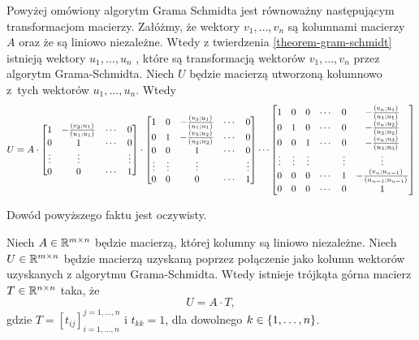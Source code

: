 \documentclass[12pt,a4paper]{report}
\newcommand{\mx}[1]{{#1}}
\newcommand{\proj}[2]{\frac{\scalar{#2}{#1}}{\scalar{#1}{#1}}}
\begin{document}
\begin{lemma} \label{lemma-matrix-formulation-of-gs}
Powyżej omówiony algorytm Grama Schmidta jest równoważny następującym transformacjom macierzy. Załóżmy, że wektory $v_{1}, \ldots, v_n$ są kolumnami macierzy $\mx{A}$ oraz że są liniowo niezależne. Wtedy z twierdzenia \ref{theorem-gram-schmidt} istnieją wektory $u_1, \ldots, u_n$ , które są transformacją wektorów $v_1, \ldots, v_n$ przez algorytm Grama-Schmidta. Niech $\mx{U}$ będzie macierzą utworzoną kolumnowo z~tych wektorów $u_1, \ldots, u_n$. Wtedy
{\small
$$
U = A \cdot 
\begin{bmatrix}
1 & -\proj{u_1}{v_2} & \cdots & 0 \\
0 & 1 & \cdots & 0 \\
\vdots & \vdots & & \vdots \\
0 & 0 & \cdots & 1
\end{bmatrix} \cdot
\begin{bmatrix}
1 & 0 & -\proj{u_1}{v_3} &\cdots & 0 \\
0 & 1 & -\proj{u_2}{v_3} &\cdots & 0 \\
0 & 0 & 1 & \cdots & 0 \\
\vdots & \vdots & \vdots &  & \vdots \\
0 & 0 & 0 & \cdots & 1
\end{bmatrix}
 \cdots
\begin{bmatrix}
1 & 0 & 0 & \cdots & 0 & -\proj{u_1}{v_n} \\
0 & 1 & 0 & \cdots & 0 &-\proj{u_2}{v_n} \\
0 & 0 & 1 & \cdots & 0 & -\proj{u_3}{v_n} \\
\vdots & \vdots & \vdots &  & \vdots & \vdots \\
0 & 0 & 0 & \cdots & 1 & -\proj{u_{n-1}}{v_n} \\
0 & 0 & 0 & \cdots & 0 & 1
\end{bmatrix}
$$ 
}
\end{lemma}

Dowód powyższego faktu jest oczywisty. 



\begin{lemma}\label{lemma-gram-schmidt-matrix}
Niech $\mx{A} \in \setR^{m \times n}$ będzie macierzą, której kolumny są liniowo niezależne. Niech $\mx{U} \in \setR^{m \times n}$ będzie macierzą uzyskaną poprzez połączenie jako kolumn wektorów uzyskanych z algorytmu Grama-Schmidta. Wtedy istnieje trójkąta górna macierz $\mx{T} \in \setR^{n \times n}$ taka, że
$$
\mx{U} = \mx{A} \cdot \mx{T},
$$
gdzie $\mx{T} = [t_{ij}]_{i = 1, \ldots , n}^{j = 1, \ldots, n}$ i $t_{kk} = 1$, dla dowolnego $k \in \left\lbrace {1,\ldots,n} \right\rbrace$.
\end{lemma}
\end{document}
